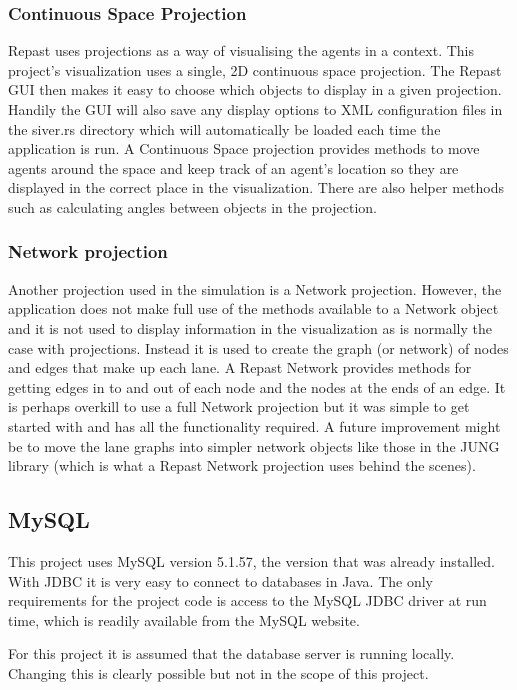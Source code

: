   \subsubsection{Continuous Space Projection}  
  Repast uses projections as a way of visualising the agents in a
  context. This project's visualization uses a single, 2D continuous
  space projection. The Repast GUI then makes it easy to choose which
  objects to display in a given projection. Handily the GUI will also
  save any display options to XML configuration files in the siver.rs
  directory which will automatically be loaded each time the
  application is run. A Continuous Space
  projection provides methods to move agents around the space and keep
  track of an agent's location so they are displayed in the correct
  place in the visualization. There are also helper methods such as
  calculating angles between objects in the projection. 


  \subsubsection{Network projection}\label{software:dependencies:repast:network}
  Another projection used in the simulation is a Network
  projection. However, the application does not make full use of the
  methods available to a Network object and it is not used to display information
  in the visualization as is normally the case with projections. Instead it is used to create the graph (or
  network) of nodes and edges that make up each lane. A Repast Network
  provides methods for getting edges in to and out of each node and
  the nodes at the ends of an edge. It is perhaps overkill to use a
  full Network projection but it was simple to get started with and
  has all the functionality required. A
  future improvement might be to move the lane graphs into simpler
  network objects like those in the JUNG library (which is what a
  Repast Network projection uses behind the scenes).


  \subsection{MySQL}
  This project uses MySQL version 5.1.57, the version that was already
  installed. With JDBC it is very easy to connect to databases in
  Java. The only requirements for the project code is access to the
  MySQL JDBC driver at run time, which is readily available from the
  MySQL website. 

  For this project it is assumed that the database server is running locally. Changing
  this is clearly possible but not in the scope of this project.

